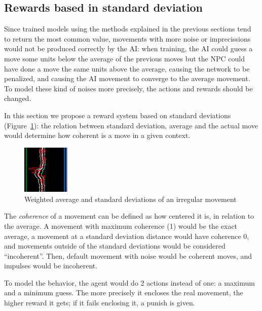 \subsection{Rewards based in standard deviation}
\label{sec:stdrew}

Since trained models using the methods explained in the previous sections tend to return the most common value, movements with more noise or imprecissions would not be produced correctly by the AI: when training, the AI could guess a move some units below the average of the previous moves but the NPC could have done a move the same units above the average, causing the network to be penalized, and causing the AI movement to converge to the average movement. To model these kind of noises more precisely, the actions and rewards should be changed.

In this section we propose a reward system based on standard deviations (Figure~\ref{fig:stdexample}): the relation between standard deviation, average and the actual move would determine how coherent is a move in a given context.
\begin{figure}
    \centering
    \includegraphics[width=0.2\textwidth]{img/graphSTD.png}
		\caption{Weighted average and standard deviations of an irregular movement}
		\label{fig:stdexample}
\end{figure}

The \emph{coherence} of a movement can be defined as how centered it is, in relation to the average. A movement with maximum coherence (1) would be the exact average, a movement at a standard deviation distance would have coherence 0, and movements outside of the standard deviations would be considered ``incoherent''. Then, default movement with noise would be coherent moves, and impulses would be incoherent.

To model the behavior, the agent would do 2 actions instead of one: a maximum and a minimum guess. The more precisely it encloses the real movement, the higher reward it gets; if it fails enclosing it, a punish is given.

